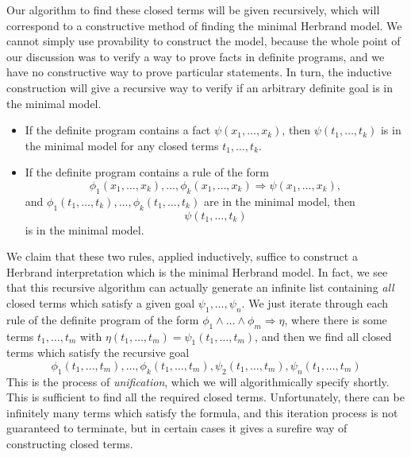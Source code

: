 Our algorithm to find these closed terms will be given recursively, which will correspond to a constructive method of finding the minimal Herbrand model. We cannot simply use provability to construct the model, because the whole point of our discussion was to verify a way to prove facts in definite programs, and we have no constructive way to prove particular statements. In turn, the inductive construction will give a recursive way to verify if an arbitrary definite goal is in the minimal model.
%
\begin{itemize}
    \item If the definite program contains a fact $\psi(x_1, \dots, x_k)$, then $\psi(t_1, \dots, t_k)$ is in the minimal model for any closed terms $t_1, \dots, t_k$.

    \item If the definite program contains a rule of the form
    \[ \phi_1(x_1, \dots, x_k), \dots, \phi_k(x_1, \dots, x_k) \Rightarrow \psi(x_1, \dots, x_k), \]
    and $\phi_1(t_1, \dots, t_k), \dots, \phi_k(t_1, \dots, t_k)$ are in the minimal model, then
    \[ \psi(t_1, \dots, t_k) \]
    is in the minimal model.
\end{itemize}
%
We claim that these two rules, applied inductively, suffice to construct a Herbrand interpretation which is the minimal Herbrand model. In fact, we see that this recursive algorithm can actually generate an infinite list containing \emph{all} closed terms which satisfy a given goal $\psi_1, \dots, \psi_n$. We just iterate through each rule of the definite program of the form $\phi_1 \wedge \dots \wedge \phi_m \Rightarrow \eta$, where there is some terms $t_1, \dots, t_m$ with $\eta(t_1, \dots, t_m) = \psi_1(t_1, \dots, t_m)$, and then we find all closed terms which satisfy the recursive goal
%
\[ \phi_1(t_1, \dots, t_m), \dots, \phi_k(t_1, \dots, t_m), \psi_2(t_1, \dots, t_m), \psi_n(t_1, \dots, t_m) \]
%
This is the process of \emph{unification}, which we will algorithmically specify shortly. This is sufficient to find all the required closed terms. Unfortunately, there can be infinitely many terms which satisfy the formula, and this iteration process is not guaranteed to terminate, but in certain cases it gives a surefire way of constructing closed terms.

